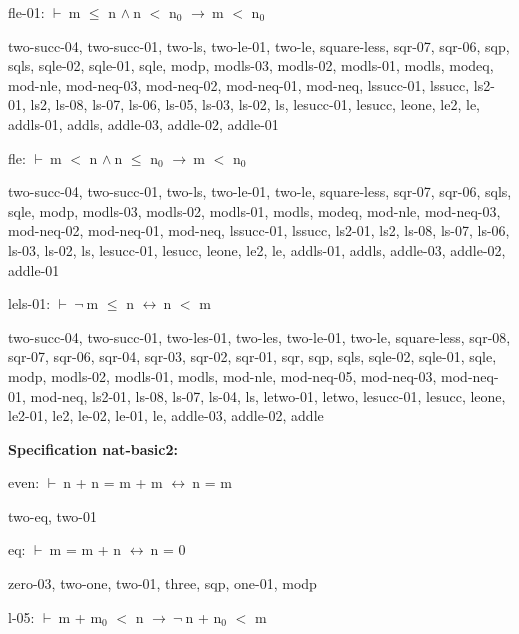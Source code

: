 \documentclass[a4paper]{article}
\newcommand{\Fol}{\mbox{$\vdash\ $}}
\newcommand{\Not}{\mbox{$\neg\ $}}
\newcommand{\And}{\mbox{$\wedge\ $}}
\newcommand{\Imp}{\mbox{$\rightarrow\ $}}
\newcommand{\Equiv}{\mbox{$\leftrightarrow\ $}}
\begin{document}
\bigskip

fle-01: 
 \Fol m $\le$ n \And n $<$ $\mbox{n}_{0}$ \Imp m $<$ $\mbox{n}_{0}$



two-succ-04, two-succ-01, two-ls, two-le-01, two-le, square-less, sqr-07, sqr-06, sqp, sqls, sqle-02, sqle-01, sqle, modp, modls-03, modls-02, modls-01, modls, modeq, mod-nle, mod-neq-03, mod-neq-02, mod-neq-01, mod-neq, lssucc-01, lssucc, ls2-01, ls2, ls-08, ls-07, ls-06, ls-05, ls-03, ls-02, ls, lesucc-01, lesucc, leone, le2, le, addls-01, addls, addle-03, addle-02, addle-01

\bigskip

fle: 
 \Fol m $<$ n \And n $\le$ $\mbox{n}_{0}$ \Imp m $<$ $\mbox{n}_{0}$



two-succ-04, two-succ-01, two-ls, two-le-01, two-le, square-less, sqr-07, sqr-06, sqls, sqle, modp, modls-03, modls-02, modls-01, modls, modeq, mod-nle, mod-neq-03, mod-neq-02, mod-neq-01, mod-neq, lssucc-01, lssucc, ls2-01, ls2, ls-08, ls-07, ls-06, ls-03, ls-02, ls, lesucc-01, lesucc, leone, le2, le, addls-01, addls, addle-03, addle-02, addle-01

\bigskip

lels-01: 
 \Fol \Not m $\le$ n \Equiv n $<$ m



two-succ-04, two-succ-01, two-les-01, two-les, two-le-01, two-le, square-less, sqr-08, sqr-07, sqr-06, sqr-04, sqr-03, sqr-02, sqr-01, sqr, sqp, sqls, sqle-02, sqle-01, sqle, modp, modls-02, modls-01, modls, mod-nle, mod-neq-05, mod-neq-03, mod-neq-01, mod-neq, ls2-01, ls-08, ls-07, ls-04, ls, letwo-01, letwo, lesucc-01, lesucc, leone, le2-01, le2, le-02, le-01, le, addle-03, addle-02, addle

\bigskip

{\bf Specification nat-basic2:}

even: 
 \Fol n + n = m + m \Equiv n = m



two-eq, two-01

\bigskip

eq: 
 \Fol m = m + n \Equiv n = 0



zero-03, two-one, two-01, three, sqp, one-01, modp

\bigskip

l-05: 
 \Fol m + $\mbox{m}_{0}$ $<$ n \Imp \Not n + $\mbox{n}_{0}$ $<$ m
\end{document}
